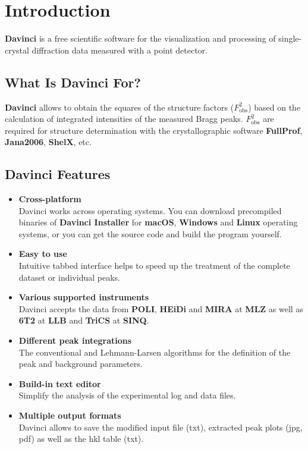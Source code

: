 \chapter{Introduction}

\textbf{Davinci} is a free scientific software for the visualization and processing of single-crystal diffraction data measured with a point detector.

\section{What Is Davinci For?}

\textbf{Davinci} allows to obtain the squares of the structure factors ($F^2_\text{obs}$) based on the calculation of integrated intensities of the measured Bragg peaks. $F^2_\text{obs}$ are required for structure determination with the crystallographic software \textbf{FullProf}, \textbf{Jana2006}, \textbf{ShelX}, etc.

\section{Davinci Features}

\begin{itemize}
	\item \textbf{Cross-platform}\\	
	Davinci works across operating systems. You can download precompiled binaries of \textbf{Davinci Installer} for \textbf{macOS}, \textbf{Windows} and \textbf{Linux} operating systems, or you can get the source code and build the program yourself.
	\item \textbf{Easy to use}\\
	Intuitive tabbed interface helps to speed up the treatment of the complete dataset or individual peaks.
	\item \textbf{Various supported instruments}\\
	Davinci accepts the data from \textbf{POLI}, \textbf{HEiDi} and \textbf{MIRA} at \textbf{MLZ} as well as \textbf{6T2} at \textbf{LLB} and \textbf{TriCS} at \textbf{SINQ}.
	\item \textbf{Different peak integrations}\\
	The conventional and Lehmann-Larsen algorithms for the definition of the peak and background parameters.
	\item \textbf{Build-in text editor}\\
	Simplify the analysis of the experimental log and data files.
	\item \textbf{Multiple output formats}\\
	Davinci allows to save the modified input file (txt), extracted peak plots (jpg, pdf) as well as the hkl table (txt).
\end{itemize}